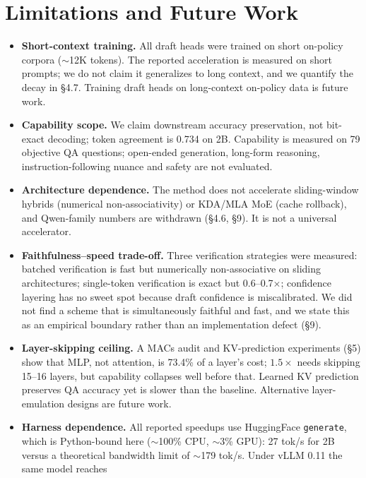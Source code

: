 \documentclass[11pt,a4paper]{article}
\begin{document}
\section{Limitations and Future Work}
\begin{itemize}[leftmargin=*]
  \item \textbf{Short-context training.} All draft heads were trained on short on-policy corpora
        ($\sim$12K tokens). The reported acceleration is measured on short prompts; we do not
        claim it generalizes to long context, and we quantify the decay in \S4.7. Training
        draft heads on long-context on-policy data is future work.
  \item \textbf{Capability scope.} We claim downstream accuracy preservation, not bit-exact
        decoding; token agreement is 0.734 on 2B. Capability is measured on 79 objective QA
        questions; open-ended generation, long-form reasoning, instruction-following nuance and
        safety are not evaluated.
  \item \textbf{Architecture dependence.} The method does not accelerate sliding-window hybrids
        (numerical non-associativity) or KDA/MLA MoE (cache rollback), and Qwen-family numbers
        are withdrawn (\S4.6, \S9). It is not a universal accelerator.
  \item \textbf{Faithfulness--speed trade-off.} Three verification strategies were measured:
        batched verification is fast but numerically non-associative on sliding architectures;
        single-token verification is exact but 0.6--0.7$\times$; confidence layering has no
        sweet spot because draft confidence is miscalibrated. We did not find a scheme that is
        simultaneously faithful and fast, and we state this as an empirical boundary rather
        than an implementation defect (\S9).
  \item \textbf{Layer-skipping ceiling.} A MACs audit and KV-prediction experiments (\S5) show
        that MLP, not attention, is 73.4\% of a layer's cost; $1.5\times$ needs skipping 15--16
        layers, but capability collapses well before that. Learned KV prediction preserves QA
        accuracy yet is slower than the baseline. Alternative layer-emulation designs are future work.
  \item \textbf{Harness dependence.} All reported speedups use HuggingFace \texttt{generate},
        which is Python-bound here ($\sim$100\% CPU, $\sim$3\% GPU): 27 tok/s for 2B versus a
        theoretical bandwidth limit of $\sim$179 tok/s. Under vLLM 0.11 the same model reaches

\end{itemize}
\end{document}
